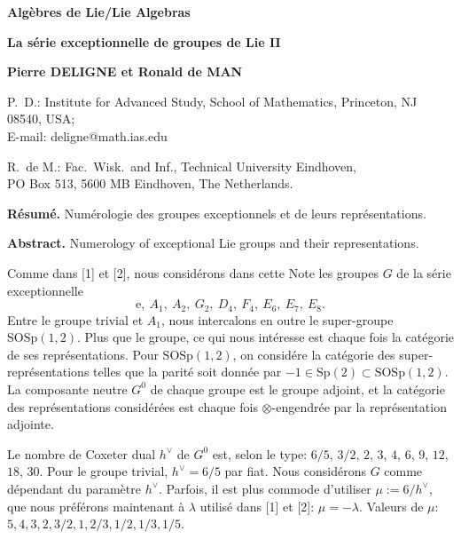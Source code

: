 \documentclass[11pt,a4paper]{article}
\theoremstyle{plain}
\theoremstyle{definition}
\begin{document}
\noindent\textbf{Alg\`ebres de Lie/Lie Algebras}

\begin{center}
\Large\textbf{La s\'erie exceptionnelle de groupes de Lie II}
\end{center}

\begin{center}
\textbf{Pierre DELIGNE et Ronald de MAN}
\end{center}

\noindent P.~D.: Institute for Advanced Study, School of Mathematics, Princeton, NJ 08540, USA;\\
E-mail: deligne@math.ias.edu

\medskip
\noindent R.~de M.: Fac.\ Wisk.\ and Inf., Technical University Eindhoven,\\
PO Box 513, 5600 MB Eindhoven, The Netherlands.

\medskip
\noindent\textbf{R\'esum\'e.} Num\'erologie des groupes exceptionnels et de leurs repr\'esentations.

\medskip
\noindent\textbf{Abstract.} Numerology of exceptional Lie groups and their representations.

\bigskip

Comme dans [1] et [2], nous consid\'erons dans cette Note les groupes $G$ de la s\'erie exceptionnelle
\[
\text{e},\ A_1,\ A_2,\ G_2,\ D_4,\ F_4,\ E_6,\ E_7,\ E_8.
\]
Entre le groupe trivial et $A_1$, nous intercalons en outre le super-groupe $\mathrm{SOSp}(1,2)$. Plus que le groupe, ce qui nous int\'eresse est chaque fois la cat\'egorie de ses repr\'esentations. Pour $\mathrm{SOSp}(1,2)$, on consid\'ere la cat\'egorie des super-repr\'esentations telles que la parit\'e soit donn\'ee par $-1 \in \mathrm{Sp}(2) \subset \mathrm{SOSp}(1,2)$. La composante neutre $G^0$ de chaque groupe est le groupe adjoint, et la cat\'egorie des repr\'esentations consid\'er\'ees est chaque fois $\otimes$-engendr\'ee par la repr\'esentation adjointe.

Le nombre de Coxeter dual $h^\vee$ de $G^0$ est, selon le type: $6/5$, $3/2$, $2$, $3$, $4$, $6$, $9$, $12$, $18$, $30$. Pour le groupe trivial, $h^\vee = 6/5$ par fiat. Nous consid\'erons $G$ comme d\'ependant du param\`etre $h^\vee$. Parfois, il est plus commode d'utiliser $\mu := 6/h^\vee$, que nous pr\'ef\'erons maintenant \`a $\lambda$ utilis\'e dans [1] et [2]: $\mu = -\lambda$. Valeurs de $\mu$: $5, 4, 3, 2, 3/2, 1, 2/3, 1/2, 1/3, 1/5$.
\end{document}
